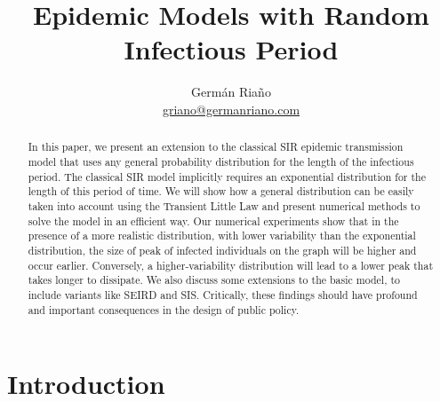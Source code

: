 \documentclass[USenglish,10pt]{article}
\begin{document}



\title{Epidemic Models with Random Infectious Period}
\author{Germ\'an Ria\~no \\ \href{mailto:griano@germanriano.com}{griano@germanriano.com}}

\maketitle


\begin{abstract}
In this paper, we present an extension to the classical SIR epidemic transmission model that uses any general probability distribution for the length of the infectious period.
The classical SIR model implicitly requires an exponential distribution for the length of this period of time.
We will show how a general distribution can be easily taken into account using the Transient Little Law and present numerical methods to solve the model in an efficient way.
Our numerical experiments show that in the presence of a more realistic distribution, with lower variability than the exponential distribution, the size of peak of infected individuals on the graph will be higher and occur earlier.
Conversely, a higher-variability distribution will lead to a lower peak that takes longer to dissipate.
We also discuss some extensions to the basic model, to include variants like SEIRD and SIS.
Critically, these findings should have profound and important consequences in the design of public policy.
\end{abstract}



\pagestyle{plain} %









\section{Introduction}\label{intro}
\end{document}
